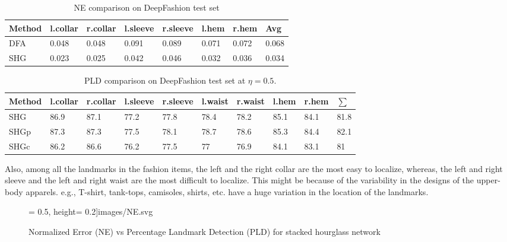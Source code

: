 \documentclass[conference]{IEEEtran}
\begin{document}
 \begin{table}[ht]
    \centering
     \scriptsize
    \caption{NE comparison on DeepFashion test set}
    \begin{tabular}{|p{0.9cm}|p{0.55cm}|p{0.6cm}|p{0.55cm}|p{0.6cm}|p{0.5cm}|p{0.5cm}|p{0.5cm}|}
    \hline
    \textbf{Method} & \textbf{l.collar} & \textbf{r.collar} & \textbf{l.sleeve} &  \textbf{r.sleeve} & \textbf{l.hem} & \textbf{r.hem} & \textbf{Avg} \\[5pt]
    \hline
    DFA \cite{liu2016fashion} & 0.048 & 0.048 & 0.091 & 0.089  & 0.071  & 0.072 & 0.068 \\[4pt]
    \hline
    SHG   & 0.023 & 0.025 & 0.042 & 0.046  & 0.032 & 0.036 & 0.034 \\[4pt]
    \hline
    \end{tabular}
    \label{table:table1}
\end{table}
 
\begin{table}[ht]
    \centering
    \tiny
    \caption{PLD comparison on DeepFashion test set at $\eta = 0.5$.}
    \begin{tabular}{|p{0.5cm}|p{0.5cm}|p{0.5cm}|p{0.5cm}|p{0.5cm}|p{0.4cm}|p{0.4cm}|p{0.4cm}|p{0.4cm}|p{0.3cm}|}
    \hline
    \textbf{Method} & \textbf{l.collar} & \textbf{r.collar} & \textbf{l.sleeve} &  \textbf{r.sleeve} &\textbf{l.waist} &\textbf{r.waist} &\textbf{l.hem}& \textbf{r.hem} & \textbf{$\sum$} \\ [5pt]
    \hline
     SHG  & 86.9 & 87.1& 77.2 & 77.8  & 78.4 & 78.2 & 85.1  & 84.1  & 81.8 \\[4pt]
    \hline
    SHGp  & 87.3 & 87.3 & 77.5 & 78.1 & 78.7 & 78.6 & 85.3 & 84.4 & 82.1 \\[4pt]
    \hline
     SHGc  &  86.2  &	86.6  &	76.2  &	77.5  &	77  &	76.9	 & 84.1  &	83.1  &	81\\[4pt]
     \hline
     \end{tabular}
     \label{table:table10}
 \end{table}
 Also, among all the landmarks in the fashion items, the left and the right collar are the most easy to localize, whereas, the left and right sleeve and the left and right waist are the most difficult to localize. This might be because of the variability in the designs of the upper-body apparels.   e.g., T-shirt, tank-tops, camisoles, shirts, etc. have a huge variation in the location of the landmarks.  

\begin{figure}[ht]
\centering
{ = 0.5\textwidth, height= 0.2\textheight]{images/NE.svg}} \\
\caption{Normalized Error (NE) vs Percentage Landmark Detection (PLD) for stacked hourglass network }
\label{fig:my_labeln}
\end{figure}
\end{document}
